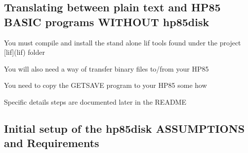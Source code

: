 \subsection*{Translating between plain text and H\+P85 B\+A\+S\+IC programs W\+I\+T\+H\+O\+UT hp85disk}


\begin{DoxyItemize}
\item You must compile and install the stand alone lif tools found under the project \mbox{[}lif\mbox{]}(lif) folder
\item You will also need a way of transfer binary files to/from your H\+P85
\begin{DoxyItemize}
\item You need to copy the G\+E\+T\+S\+A\+VE program to your H\+P85 some how
\end{DoxyItemize}
\item Specific details steps are documented later in the R\+E\+A\+D\+ME
\end{DoxyItemize}

\subsection*{Initial setup of the hp85disk A\+S\+S\+U\+M\+P\+T\+I\+O\+NS and Requirements}


